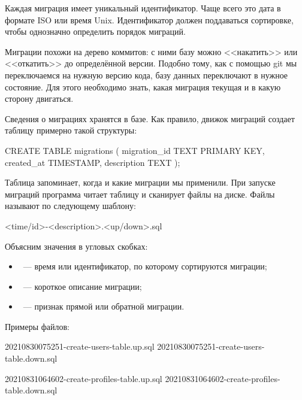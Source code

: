 Каждая миграция имеет уникальный идентификатор. Чаще всего это дата в формате ISO или время Unix. Идентификатор должен поддаваться сортировке, чтобы однозначно определить порядок миграций.

Миграции похожи на дерево коммитов: с ними базу можно <<накатить>> или <<откатить>> до определённой версии. Подобно тому, как с помощью git мы переключаемся на нужную версию кода, базу данных переключают в нужное состояние. Для этого необходимо знать, какая миграция текущая и в какую сторону двигаться.

Сведения о миграциях хранятся в базе. Как правило, движок миграций создает таблицу  примерно такой структуры:

\begin{english}
  \begin{sql}
CREATE TABLE migrations (
  migration_id TEXT PRIMARY KEY,
  created_at TIMESTAMP,
  description TEXT
);
  \end{sql}
\end{english}

Таблица запоминает, когда и какие миграции мы применили. При запуске миграций программа читает таблицу и сканирует файлы на диске. Файлы называют по следующему шаблону:

\begin{english}
  \begin{text}
<time/id>-<description>.<up/down>.sql
  \end{text}
\end{english}

Объясним значения в угловых скобках:

\pagebreaklarge

\begin{itemize}

\item
  ~--- время или идентификатор, по которому сортируются миграции;

\item
  ~--- короткое описание миграции;

\item
  ~--- признак прямой или обратной миграции.

\end{itemize}

Примеры файлов:

\begin{english}
  \begin{text}
20210830075251-create-users-table.up.sql
20210830075251-create-users-table.down.sql

20210831064602-create-profiles-table.up.sql
20210831064602-create-profiles-table.down.sql
  \end{text}
\end{english}

